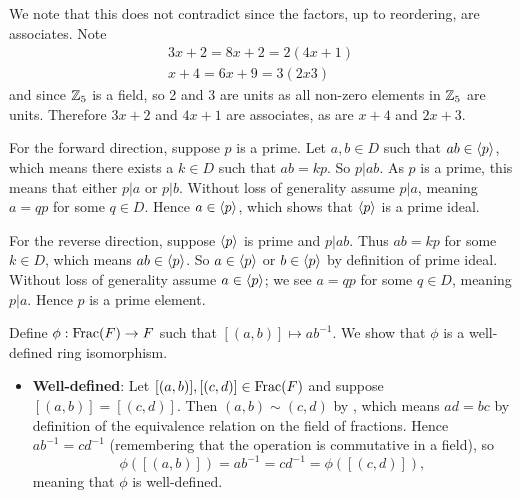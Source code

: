 \begin{questions}
    We note that this does not contradict  since the factors, up to reordering, are associates. Note
    \begin{align*}
        3x+2 = 8x+2 = 2(4x+1)\\
        x+4 = 6x+9 = 3(2x3)
    \end{align*}
    and since $\mathbb{Z}_5$ is a field, so 2 and 3 are units as all non-zero elements in $\mathbb{Z}_5$ are units. Therefore $3x+2$ and $4x+1$ are associates, as are $x+4$ and $2x+3$.

    \item For the forward direction, suppose $p$ is a prime. Let $a, b \in D$ such that $ab \in \left\langle p\right\rangle$, which means there exists a $k \in D$ such that $ab = kp$. So $p \vert ab$. As $p$ is a prime, this means that either $p \vert a$ or $p \vert b$. Without loss of generality assume $p \vert a$, meaning $a = qp$ for some $q \in D$. Hence $a \in \left\langle p\right\rangle$, which shows that $\left\langle p\right\rangle$ is a prime ideal.

    For the reverse direction, suppose $\left\langle p\right\rangle$ is prime and $p \vert ab$. Thus $ab = kp$ for some $k \in D$, which means $ab \in \left\langle p\right\rangle$. So $a \in \left\langle p\right\rangle$ or $b \in \left\langle p\right\rangle$ by definition of prime ideal. Without loss of generality assume $a \in \left\langle p\right\rangle$; we see $a = qp$ for some $q \in D$, meaning $p \vert a$. Hence $p$ is a prime element.

    \item Define $\phi: \mathrm{Frac}(F) \to F$ such that $[(a,b)]\mapsto ab^{-1}$. We show that $\phi$ is a well-defined ring isomorphism.
    \begin{itemize}
        \item \textbf{Well-defined}: Let $[(a,b)], [(c,d)] \in \mathrm{Frac}(F)$ and suppose $[(a,b)] = [(c,d)]$. Then $(a,b) \mathrel{\sim} (c,d)$ by , which means $ad = bc$ by definition of the equivalence relation on the field of fractions. Hence $ab^{-1} = cd^{-1}$ (remembering that the operation is commutative in a field), so
        \[
            \phi([(a,b)]) = ab^{-1} = cd^{-1} = \phi([(c,d)]),
        \]
        meaning that $\phi$ is well-defined.


\end{itemize}
\end{questions}
